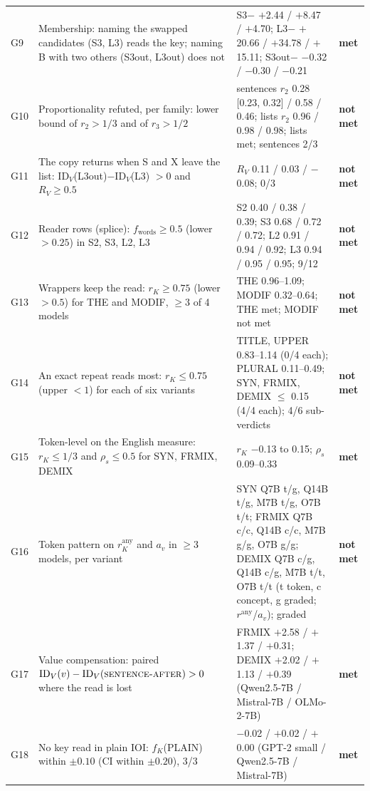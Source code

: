 \begin{tabular}{p{}p{}p{}p{}}
\midrule
G9 & Membership: naming the swapped candidates (S3, L3) reads the key; naming B with two others (S3out, L3out) does not & S3$-$\fmtNone{} $+$2.44 / $+$8.47 / $+$4.70; L3$-$\fmtNone{} $+$20.66 / $+$34.78 / $+$15.11; S3out$-$\fmtNone{} $-$0.32 / $-$0.30 / $-$0.21 & \textbf{met} \\
G10 & Proportionality refuted, per family: lower bound of $r_2 > 1/3$ and of $r_3 > 1/2$ & sentences $r_2$ 0.28 [0.23, 0.32] / 0.58 / 0.46; lists $r_2$ 0.96 / 0.98 / 0.98; lists met; sentences 2/3 & \textbf{not met} \\
G11 & The copy returns when S and X leave the list: $\mathrm{ID}_V$(L3out)$-\mathrm{ID}_V$(L3) $> 0$ and $R_V \geq 0.5$ & $R_V$ 0.11 / 0.03 / $-$0.08; 0/3 & \textbf{not met} \\
G12 & Reader rows (splice): $f_{\mathrm{words}} \geq 0.5$ (lower $> 0.25$) in S2, S3, L2, L3 & S2 0.40 / 0.38 / 0.39; S3 0.68 / 0.72 / 0.72; L2 0.91 / 0.94 / 0.92; L3 0.94 / 0.95 / 0.95; 9/12 & \textbf{not met} \\
\midrule
G13 & Wrappers keep the read: $r_K \geq 0.75$ (lower $> 0.5$) for THE and MODIF, $\geq 3$ of 4 models & THE 0.96--1.09; MODIF 0.32--0.64; THE met; MODIF not met & \textbf{not met} \\
G14 & An exact repeat reads most: $r_K \leq 0.75$ (upper $< 1$) for each of six variants & TITLE, UPPER 0.83--1.14 (0/4 each); PLURAL 0.11--0.49; SYN, FRMIX, DEMIX $\leq$ 0.15 (4/4 each); 4/6 sub-verdicts & \textbf{not met} \\
G15 & Token-level on the English measure: $r_K \leq 1/3$ and $\rho_s \leq 0.5$ for SYN, FRMIX, DEMIX & $r_K$ $-$0.13 to 0.15; $\rho_s$ 0.09--0.33 & \textbf{met} \\
G16 & Token pattern on $r_K^{\mathrm{any}}$ and $a_v$ in $\geq 3$ models, per variant & SYN Q7B t/g, Q14B t/g, M7B t/g, O7B t/t; FRMIX Q7B c/c, Q14B c/c, M7B g/g, O7B g/g; DEMIX Q7B c/g, Q14B c/g, M7B t/t, O7B t/t (t token, c concept, g graded; $r^{\mathrm{any}}$/$a_v$); graded & \textbf{not met} \\
G17 & Value compensation: paired $\mathrm{ID}_V(v) - \mathrm{ID}_V(\text{\textsc{sentence-after}{}}) > 0$ where the read is lost & FRMIX $+$2.58 / $+$1.37 / $+$0.31; DEMIX $+$2.02 / $+$1.13 / $+$0.39 (Qwen2.5-7B / Mistral-7B / OLMo-2-7B) & \textbf{met} \\
\midrule
G18 & No key read in plain IOI: $f_K$(PLAIN) within $\pm 0.10$ (CI within $\pm 0.20$), 3/3 & $-$0.02 / $+$0.02 / $+$0.00 (GPT-2 small / Qwen2.5-7B / Mistral-7B) & \textbf{met} \\

\end{tabular}
